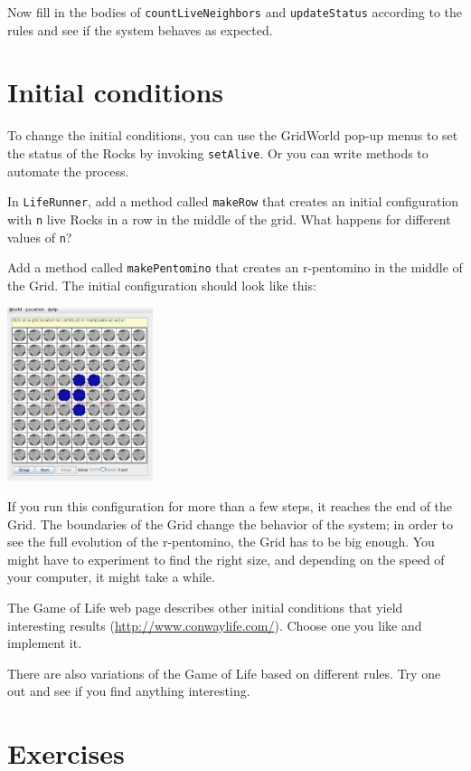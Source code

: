 \documentclass[12pt]{book}
\theoremstyle{exercise}
\begin{document}
Now fill in the bodies of {\tt countLiveNeighbors} and
{\tt updateStatus} according to the rules and see if the system behaves
as expected.


\section{Initial conditions}

To change the initial conditions, you can use the GridWorld pop-up
menus to set the status of the Rocks by invoking {\tt setAlive}.
Or you can write methods to automate the process.

In {\tt LifeRunner}, add a method called {\tt makeRow} that creates
an initial configuration with {\tt n} live Rocks in a row in the middle
of the grid.  What happens for different values of {\tt n}?

Add a method called {\tt makePentomino} that creates
an r-pentomino in the middle of the Grid.  The initial configuration
should look like this:

\includegraphics[height=2in]{figs/LifeRunner.pdf}

If you run this configuration for more than a few steps, it reaches the
end of the Grid.  The boundaries of the Grid change the behavior of
the system; in order to see the full evolution of the r-pentomino,
the Grid has to be big enough.  You might have to experiment to find
the right size, and depending on the speed of your computer, it
might take a while.

The Game of Life web page describes other initial conditions that
yield interesting results (\url{http://www.conwaylife.com/}).  Choose
one you like and implement it.

There are also variations of the Game of Life based on different rules.
Try one out and see if you find anything interesting.

\section{Exercises}
\end{document}
